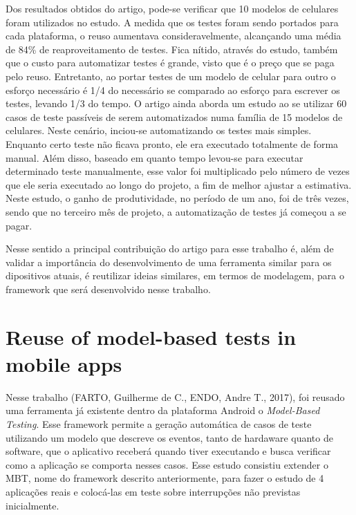 \documentclass[
    12pt,       %
    openright,      %
    twoside,      %
    a4paper,      %
    english,      %
    french,       %
    spanish,      %
    brazil,       %
    ]{abntex2}
\begin{document}
      Dos resultados obtidos do artigo, pode-se verificar que 10 modelos de celulares foram utilizados no
      estudo. A medida que os testes foram sendo portados para cada plataforma, o reuso aumentava
      consideravelmente, alcançando uma média de 84\% de reaproveitamento de testes. Fica nítido, através
      do estudo, também que o custo para automatizar testes é grande, visto que é o preço que se paga pelo
      reuso. Entretanto, ao portar testes de um modelo de celular para outro o esforço necessário é 1/4 do
      necessário se comparado ao esforço para escrever os testes, levando 1/3 do tempo. O artigo ainda
      aborda um estudo ao se utilizar 60 casos de teste passíveis de serem automatizados numa família de 15
      modelos de celulares. Neste cenário, inciou-se automatizando os testes mais simples. Enquanto certo
      teste não ficava pronto, ele era executado totalmente de forma manual. Além disso, baseado em quanto
      tempo levou-se para executar determinado teste manualmente, esse valor foi multiplicado pelo número de
      vezes que ele seria executado ao longo do projeto, a fim de melhor ajustar a estimativa. Neste estudo,
      o ganho de produtividade, no período de um ano, foi de três vezes, sendo que no terceiro mês de projeto,
      a automatização de testes já começou a se pagar.

      Nesse sentido a principal contribuição do artigo para esse trabalho é, além de validar a importância
      do desenvolvimento de uma ferramenta similar para os dipositivos atuais, é reutilizar ideias similares,
      em termos de modelagem, para o framework que será desenvolvido nesse trabalho.

    \section{Reuse of model-based tests in mobile apps}
      Nesse trabalho (FARTO, Guilherme de C., ENDO, Andre T., 2017), foi reusado uma ferramenta já existente
      dentro da plataforma Android o \textit{Model-Based Testing}. Esse framework permite a geração
      automática de casos de teste utilizando um modelo que descreve os eventos, tanto de hardaware
      quanto de software, que o aplicativo receberá quando tiver executando e busca verificar como a
      aplicação se comporta nesses casos. Esse estudo consistiu extender o MBT, nome do framework descrito
      anteriormente, para fazer o estudo de 4 aplicações reais e colocá-las em teste sobre interrupções não
      previstas inicialmente.
\end{document}
